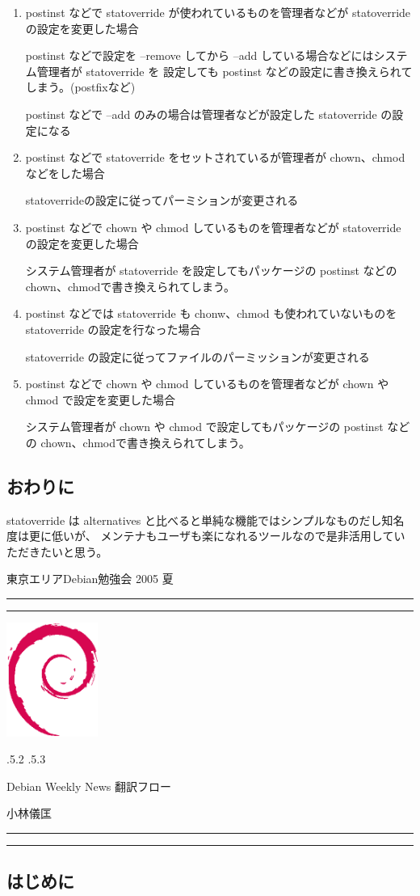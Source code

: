 \documentclass[mingoth,a4paper]{jsarticle}
\makeatletter
\renewcommand{\section}{\@startsection{section}{1}{\z@}%
    {\Cvs \@plus.5\Cdp \@minus.2\Cdp}%
    {.5\Cvs \@plus.3\Cdp}%
    {\normalfont\Large\headfont\raggedright\centering}} %
\newcommand{\dancersection}[2]{%
\newpage
東京エリアDebian勉強会 2005 夏
\hrule
\vspace{0.5mm}
\hrule
\hfill{}\includegraphics[width=3cm]{image200502/openlogo-nd.eps}\\
\vspace{-4cm}
\begin{center}
  \section{#1}
\end{center}
\hfill{}#2\hspace{3cm}\space\\
\hrule
\hrule
\vspace{1cm}
}
\makeatother
\begin{document}
\begin{enumerate}
  \item postinst などで statoverride が使われているものを管理者などが statoverride の設定を変更した場合

    postinst などで設定を --remove してから --add している場合などにはシステム管理者が statoverride を
    設定しても postinst などの設定に書き換えられてしまう。(postfixなど)

    postinst などで --add のみの場合は管理者などが設定した statoverride の設定になる

  \item postinst などで statoverride をセットされているが管理者が chown、chmod などをした場合

    statoverrideの設定に従ってパーミションが変更される

  \item postinst などで chown や chmod しているものを管理者などが statoverride の設定を変更した場合

    システム管理者が statoverride を設定してもパッケージの postinst などの chown、chmodで書き換えられてしまう。

  \item postinst などでは statoverride も chonw、chmod も使われていないものを statoverride の設定を行なった場合

    statoverride の設定に従ってファイルのパーミッションが変更される

  \item postinst などで chown や chmod しているものを管理者などが chown や chmod で設定を変更した場合

    システム管理者が chown や chmod で設定してもパッケージの postinst などの chown、chmodで書き換えられてしまう。

\end{enumerate}

\subsection{おわりに}

  statoverride は alternatives と比べると単純な機能ではシンプルなものだし知名度は更に低いが、
  メンテナもユーザも楽になれるツールなので是非活用していただきたいと思う。


\dancersection{Debian Weekly News 翻訳フロー}{小林儀匡}
\label{sec:kobayashi}

\subsection{はじめに}
\end{document}
